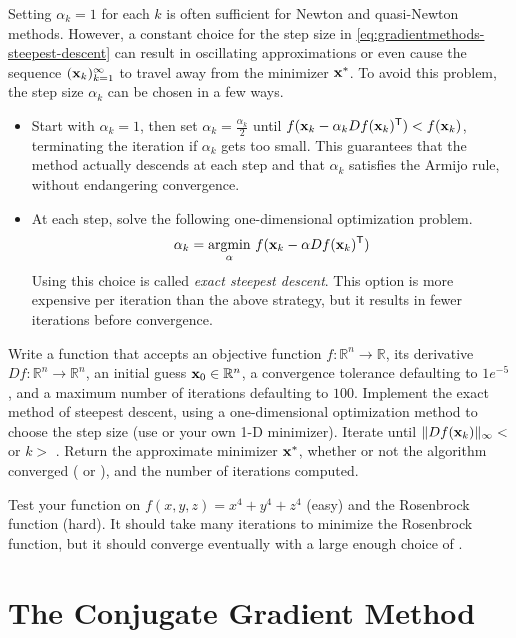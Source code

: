 Setting $\alpha_k = 1$ for each $k$ is often sufficient for Newton and quasi-Newton methods.
However, a constant choice for the step size in \eqref{eq:gradientmethods-steepest-descent} can result in oscillating approximations or even cause the sequence $(\mathbf{x}_k)_{k=1}^\infty$ to travel away from the minimizer $\mathbf{x}^*$.
To avoid this problem, the step size $\alpha_k$ can be chosen in a few ways.
\begin{itemize}
    \item Start with $\alpha_k = 1$, then set $\alpha_k = \frac{\alpha_k}{2}$ until $f(\mathbf{x}_k - \alpha_k Df(\mathbf{x}_k)^{\mathsf T}) < f(\mathbf{x}_k)$, terminating the iteration if $\alpha_k$ gets too small.
    This guarantees that the method actually descends at each step and that $\alpha_k$ satisfies the Armijo rule, without endangering convergence.

    \item At each step, solve the following one-dimensional optimization problem.
    \[
    \alpha_k = \underset{\alpha}{\text{argmin}}\ f(\mathbf{x}_k - \alpha Df(\mathbf{x}_k)^{\mathsf T})
    \]
    Using this choice is called \emph{exact steepest descent}.
    This option is more expensive per iteration than the above strategy, but it results in fewer iterations before convergence.
\end{itemize}

\begin{problem} %
Write a function that accepts an objective function $f:\mathbb{R}^n\rightarrow\mathbb{R}$, its derivative $Df:\mathbb{R}^n\rightarrow\mathbb{R}^n$, an initial guess $\mathbf{x}_0\in\mathbb{R}^n$, a convergence tolerance  defaulting to $1e^{-5}$, and a maximum number of iterations  defaulting to $100$.
Implement the exact method of steepest descent, using a one-dimensional optimization method to choose the step size (use  or your own 1-D minimizer).
Iterate until $\|Df(\mathbf{x}_k)\|_{\infty} < $  or $k > $ .
Return the approximate minimizer $\mathbf{x}^*$, whether or not the algorithm converged ( or ), and the number of iterations computed.

Test your function on $f(x,y,z) = x^4 + y^4 + z^4$ (easy) and the Rosenbrock function (hard).
It should take many iterations to minimize the Rosenbrock function, but it should converge eventually with a large enough choice of .
\label{prob:gradientmethods-steepest-descent}
\end{problem}

\section*{The Conjugate Gradient Method} %

